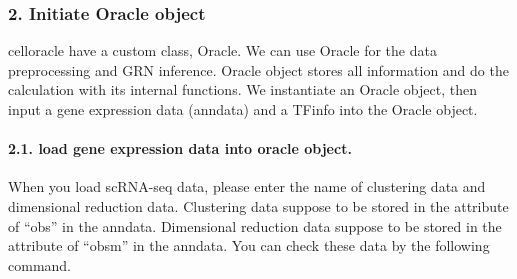 \documentclass[letterpaper,10pt,english]{sphinxmanual}
\begin{document}
\subsubsection{2. Initiate Oracle object}
\label{\detokenize{notebooks/04_Network_analysis/Network_analysis_with_with_Paul_etal_2015_data:2.-Initiate-Oracle-object}}
celloracle have a custom class, Oracle. We can use Oracle for the data preprocessing and GRN inference. Oracle object stores all information and do the calculation with its internal functions. We instantiate an Oracle object, then input a gene expression data (anndata) and a TFinfo into the Oracle object.

{
%
\begin{sphinxVerbatim}[commandchars=\\\{\}]
\llap{\color{nbsphinxin}[9]:\,\hspace{\fboxrule}\hspace{\fboxsep}}
  
\end{sphinxVerbatim}
}


\paragraph{2.1. load gene expression data into oracle object.}
\label{\detokenize{notebooks/04_Network_analysis/Network_analysis_with_with_Paul_etal_2015_data:2.1.-load-gene-expression-data-into-oracle-object.}}
When you load scRNA-seq data, please enter the name of clustering data and dimensional reduction data. Clustering data suppose to be stored in the attribute of “obs” in the anndata. Dimensional reduction data suppose to be stored in the attribute of “obsm” in the anndata. You can check these data by the following command.

{
%
\begin{sphinxVerbatim}[commandchars=\\\{\}]
\llap{\color{nbsphinxin}[18]:\,\hspace{\fboxrule}\hspace{\fboxsep}}
 
 
\end{sphinxVerbatim}
}
\end{document}
